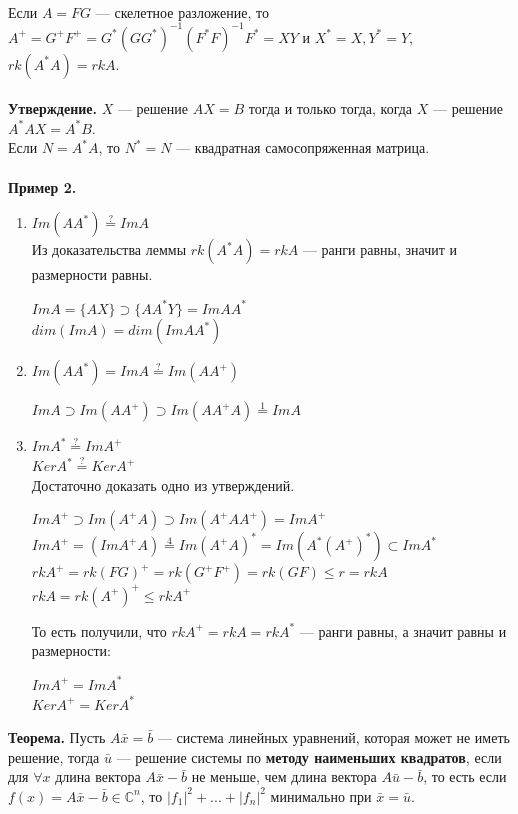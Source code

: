 \documentclass[12pt]{article}
\theoremstyle{definition}
\numberwithin{equation}{section}
\begin{document}
\\
Если $A=FG$ --- скелетное разложение, то 
$A^+=G^+F^+=G^*(GG^*)^{-1}(F^*F)^{-1}F^*=XY$ и 
$X^*=X, Y^*=Y$, 
$rk(A^*A)=rkA$.\\
\\
\textbf{Утверждение.}
$X$ --- решение $AX=B$ тогда и только тогда, когда $X$ --- решение $A^*AX=A^*B$.\\
Если $N=A^*A$, то $N^*=N$ --- квадратная самосопряженная матрица.\\
\\
\textbf{Пример 2.}\begin{enumerate}
\item $Im(AA^*)\overset{?}{=}ImA$\\
Из доказательства леммы $rk(A^*A)=rkA$ --- ранги равны, значит и размерности равны.
\begin{center} $ImA=\{AX\} \supset \{AA^*Y\}=ImAA^*$\\
$dim(ImA)=dim(ImAA^*)$
\end{center}
\item $Im(AA^*)=ImA\overset{?}{=}Im(AA^+)$
\begin{center}
$ImA\supset Im(AA^+) \supset Im(AA^+A) \overset{1}{=} ImA$
\end{center}
\item $ImA^* \overset{?}{=} ImA^+$\\
$KerA^* \overset{?}{=} KerA^+$\\
Достаточно доказать одно из утверждений.
\begin{center}
$ImA^+ \supset Im(A^+A) \supset Im(A^+AA^+) = ImA^+$\\
$ImA^+=(ImA^+A) \overset{4}{=} Im(A^+A)^* = Im(A^*(A^+)^*) \subset ImA^*$\\
$rkA^+=rk(FG)^+=rk(G^+F^+)=rk(GF) \leqslant r = rkA$\\
$rkA=rk(A^+)^+ \leqslant rk A^+$
\end{center}
То есть получили, что $rkA^+=rkA=rkA^*$ --- ранги равны, а значит равны и размерности:
\begin{center}
$ImA^+=ImA^*$\\
$KerA^+=KerA^*$
\end{center}
\end{enumerate}
\textbf{Теорема.}
Пусть $A\bar x = \bar b$ --- система линейных уравнений, которая может не иметь решение, тогда $\bar u$ --- решение системы по \textbf{методу наименьших квадратов}, если для $\forall x$ длина вектора $A\bar x - \bar b$ не меньше, чем длина вектора $A\bar u - \bar b$, то есть если $f(x)=A\bar x - \bar b \in \mathbb{C}^n$, то $|f_1|^2+...+|f_n|^2$ минимально при $\bar x = \bar u$.\\
\end{document}
